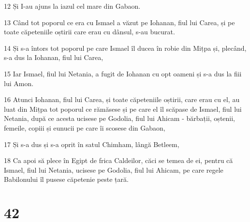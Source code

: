 \par 12 Și I-au ajuns la iazul cel mare din Gabaon.
\par 13 Când tot poporul ce era cu Ismael a văzut pe Iohanan, fiul lui Carea, și pe toate căpeteniile oștirii care erau cu dânsul, s-au bucurat.
\par 14 Și s-a întors tot poporul pe care Ismael îl ducea în robie din Mițpa și, plecând, s-a dus la Iohanan, fiul lui Carea,
\par 15 Iar Ismael, fiul lui Netania, a fugit de Iohanan cu opt oameni și s-a dus la fiii lui Amon.
\par 16 Atunci Iohanan, fiul lui Carea, și toate căpeteniile oștirii, care erau cu el, au luat din Mițpa tot poporul ce rămăsese și pe care el îl scăpase de Ismael, fiul lui Netania, după ce acesta ucisese pe Godolia, fiul lui Ahicam - bărbații, oștenii, femeile, copiii și eunucii pe care îi scosese din Gabaon,
\par 17 Și s-a dus și s-a oprit în satul Chimham, lângă Betleem,
\par 18 Ca apoi să plece în Egipt de frica Caldeilor, căci se temea de ei, pentru că Ismael, fiul lui Netania, ucisese pe Godolia, fiul lui Ahicam, pe care regele Babilonului îl pusese căpetenie peste țară.

\chapter{42}

